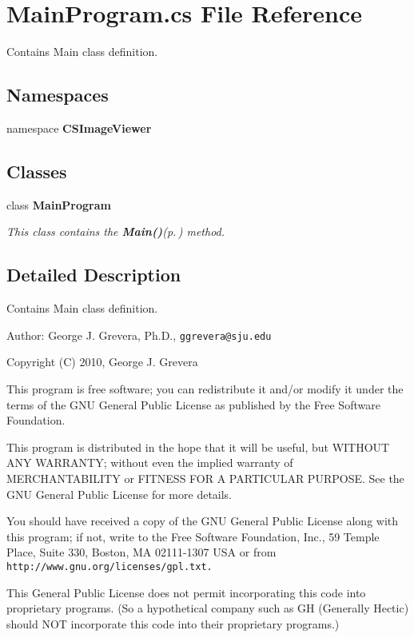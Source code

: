 \section{Main\-Program.cs File Reference}
\label{_main_program_8cs}
Contains Main class definition. 

\subsection*{Namespaces}
\begin{CompactItemize}
\item 
namespace {\bf CSImage\-Viewer}
\end{CompactItemize}
\subsection*{Classes}
\begin{CompactItemize}
\item 
class {\bf Main\-Program}
\begin{CompactList}\small\item\em This class contains the {\bf Main()}{\rm (p.\,\pageref{class_c_s_image_viewer_1_1_main_program_1f7e61855217a4f3ad075ae5cb5a7cff})} method. \item\end{CompactList}\end{CompactItemize}


\subsection{Detailed Description}
Contains Main class definition. 

\begin{Desc}
\item[Author:]George J. Grevera, Ph.D., {\tt ggrevera@sju.edu}\end{Desc}
Copyright (C) 2010, George J. Grevera

This program is free software; you can redistribute it and/or modify it under the terms of the GNU General Public License as published by the Free Software Foundation.

This program is distributed in the hope that it will be useful, but WITHOUT ANY WARRANTY; without even the implied warranty of MERCHANTABILITY or FITNESS FOR A PARTICULAR PURPOSE. See the GNU General Public License for more details.

You should have received a copy of the GNU General Public License along with this program; if not, write to the Free Software Foundation, Inc., 59 Temple Place, Suite 330, Boston, MA 02111-1307 USA or from {\tt http://www.gnu.org/licenses/gpl.txt.}

This General Public License does not permit incorporating this code into proprietary programs. (So a hypothetical company such as GH (Generally Hectic) should NOT incorporate this code into their proprietary programs.) 